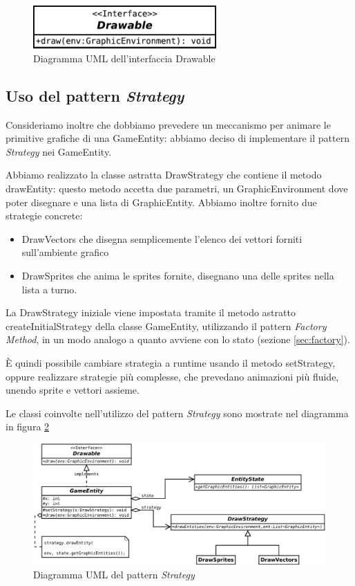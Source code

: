 \documentclass[a4paper,12pt]{article}
\begin{document}
\begin{figure}[ht]
\centering
\includegraphics[width=7cm]{Drawable.pdf}
\caption{Diagramma UML dell'interfaccia \textsf{Drawable}}
\label{img:Drawable}
\end{figure}

\subsection{Uso del pattern \emph{Strategy}}

Consideriamo inoltre che dobbiamo prevedere un meccanismo per animare le primitive grafiche di una \textsf{GameEntity}: abbiamo deciso di implementare il pattern \emph{Strategy} nei \textsf{GameEntity}.

Abbiamo realizzato la classe astratta \textsf{DrawStrategy} che contiene il metodo \textsf{drawEntity}: questo metodo accetta due parametri, un \textsf{GraphicEnvironment} dove poter disegnare e una lista di \textsf{GraphicEntity}. Abbiamo inoltre fornito due strategie concrete:

\begin{itemize}
\item \textsf{DrawVectors} che disegna semplicemente l'elenco dei vettori forniti sull'ambiente grafico
\item \textsf{DrawSprites} che anima le sprites fornite, disegnano una delle sprites nella lista a turno.
\end{itemize}

La \textsf{DrawStrategy} iniziale viene impostata tramite il metodo astratto \textsf{createInitialStrategy} della classe \textsf{GameEntity}, utilizzando il pattern \emph{Factory Method}, in un modo analogo a quanto avviene con lo stato (sezione \ref{sec:factory}).

\`E quindi possibile cambiare strategia a runtime usando il metodo \textsf{setStrategy}, oppure realizzare strategie pi\`u complesse, che prevedano animazioni pi\`u fluide, unendo sprite e vettori assieme.

Le classi coinvolte nell'utilizzo del pattern \emph{Strategy} sono mostrate nel diagramma in figura \ref{img:Strategy}

\begin{figure}[ht]
\centering
\includegraphics[width=14cm]{Strategy.pdf}
\caption{Diagramma UML del pattern \emph{Strategy}}
\label{img:Strategy}
\end{figure}
\end{document}
